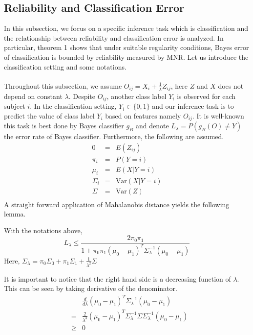 \documentclass{article}
\begin{document}
\subsection{Reliability and Classification Error}

In this subsection, we focus on a specific inference task which is classification and the relationship between reliability and classification error is analyzed. In particular, theorem 1 shows that under suitable regularity conditions, Bayes error of classification is bounded by reliability measured by MNR. Let us introduce the classification setting and some notations. \\
\\
Throughout this subsection, we assume $O_{ij}=X_i+ \frac{1}{\lambda} Z_{ij}$, here $Z$ and $X$ does not depend on constant $\lambda$. Despite $O_{ij}$, another class label $Y_i$ is observed for each subject $i$. In the classification setting, $Y_i \in \{0,1\}$ and our inference task is to predict the value of class label $Y_i$ based on features namely $O_{ij}$. It is well-known this task is best done by Bayes classifier $g_B$ and denote $L_{\lambda}=P(g_B(O)\neq Y)$ the error rate of Bayes classifier. Furthermore, the following are assumed.
\begin{eqnarray*}
0&=& E(Z_{ij}) \\
\pi_i &=&P(Y=i) \\
\mu_i &=&E(X|Y=i)\\
\Sigma_i&=& \text{Var}(X|Y=i)  \\
\Sigma &=& \text{Var}(Z)  \\
\end{eqnarray*}
A straight forward application of Mahalanobis distance yields the following lemma.
\begin{lemma} With the notations above,
\[L_\lambda \leq \frac{2\pi_0\pi_1}{1+\pi_0\pi_1(\mu_0-\mu_1)^T\Sigma_\lambda^{-1}(\mu_0-\mu_1)}\]
Here, $\Sigma_\lambda=\pi_0\Sigma_0+\pi_1\Sigma_1+\frac{1}{\lambda^2}\Sigma$ 
\end{lemma}
\noindent It is important to notice that the right hand side is a decreasing function of $\lambda$. This can be seen by taking derivative of the denominator.
\begin{eqnarray*}
& &\frac{d}{d\lambda}(\mu_0-\mu_1)^T\Sigma_\lambda^{-1}(\mu_0-\mu_1) \\
&=&\frac{2}{\lambda^3}(\mu_0-\mu_1)^T\Sigma_\lambda^{-1}\Sigma\Sigma_\lambda^{-1}(\mu_0-\mu_1) \\
&\geq&  0
\end{eqnarray*}
\end{document}
